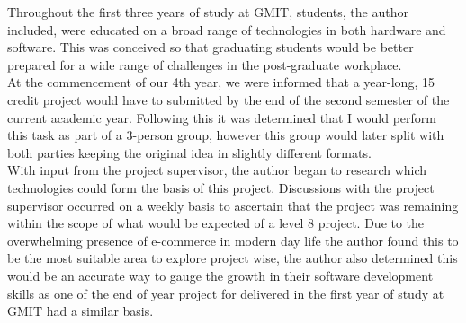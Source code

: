 Throughout the first three years of study at GMIT, students, the author included, were educated on a broad range of technologies in both hardware and software. This was conceived so that graduating students would be better prepared for a wide range of challenges in the post-graduate workplace.\\
At the commencement of our 4th year, we were informed that a year-long, 15 credit project would have to submitted by the end of the second semester of the current academic year. Following this it was determined that I would perform this task as part of a 3-person group, however this group would later split with both parties keeping the original idea in slightly different formats. \\
With input from the project supervisor, the author began to research which technologies could form the basis of this project. Discussions with the project supervisor occurred on a weekly basis to ascertain that the project was remaining within the scope of what would be expected of a level 8 project. Due to the overwhelming presence of e-commerce in modern day life the author found this to be the most suitable area to explore project wise, the author also determined this would be an accurate way to gauge the growth in their software development skills as one of the end of year project for delivered in the first year of study at GMIT had a similar basis. 

\newpage
